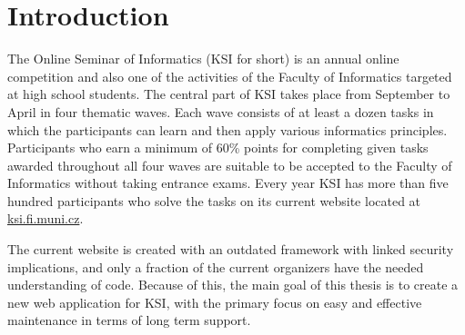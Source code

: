 \documentclass[
  digital, %
  oneside, %
  lof,     %
  nolot,     %
]{fithesis4}
\begin{document}
\clearpage
\printnoidxglossary[title={Abbreviations}, type=\acronymtype]
\printnoidxglossary[title={Glossary}]

\chapter*{Introduction}

\mdstart

The Online Seminar of Informatics (KSI for short) is an annual online competition and also one of the activities of the Faculty of Informatics targeted at high school students. The central part of \acrshort{KSI} takes place from September to April in four thematic waves. Each wave consists of at least a dozen tasks in which the participants can learn and then apply various informatics principles. Participants who earn a minimum of 60\% points for completing given tasks awarded throughout all four waves are suitable to be accepted to the Faculty of Informatics without taking entrance exams. Every year \acrshort{KSI} has more than five hundred participants who solve the tasks on its current website located at \href{https://ksi.fi.muni.cz}{ksi.fi.muni.cz}.

The current website is created with an outdated framework with linked security implications, and only a fraction of the current organizers have the needed understanding of code. Because of this, the main goal of this thesis is to create a new web application for \acrshort{KSI}, with the primary focus on easy and effective maintenance in terms of long term support.
\end{document}
